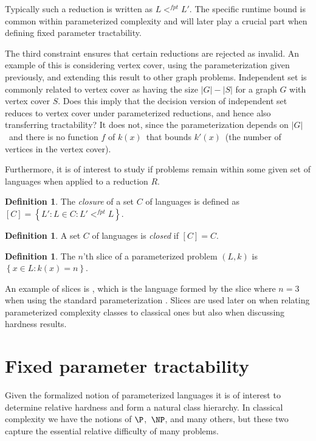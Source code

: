 \documentclass[a4paper,11pt]{report}
\theoremstyle{plain}
\theoremstyle{definition}
\newtheorem{defn}[thm]{Definition} %
\begin{document}
Typically such a reduction is written as $L <^{fpt} L'$.
The specific runtime bound is common within parameterized complexity and will later play a crucial part when defining fixed parameter tractability.

The third constraint ensures that certain reductions are rejected as invalid.
An example of this is considering vertex cover, using the parameterization given previously, and extending this result to other graph problems.
Independent set is commonly related to vertex cover as having the size $|G| - |S|$ for a graph $G$ with vertex cover $S$.
Does this imply that the decision version of independent set reduces to vertex cover under parameterized reductions, and hence also transferring tractability?
It does not, since the parameterization depends on $|G|$ and there is no function $f$ of $k(x)$ that bounds $k'(x)$ (the number of vertices in the vertex cover).

Furthermore, it is of interest to study if problems remain within some given set of languages when applied to a reduction $R$.

\begin{defn}
The \emph{closure} of a set $C$ of languages is defined as $\left[ C \right] = \left\{ L' : L \in C : L' <^{fpt} L\right\}$.
\end{defn}

\begin{defn}
A set $C$ of languages is \emph{closed} if $\left[ C \right] = C$.
\end{defn}

\begin{defn}
The $n$'th slice of a parameterized problem $(L, k)$ is $\left\{ x \in L : k(x) = n \right\}$.
\end{defn}

An example of slices is , which is the language formed by the slice where $n = 3$ when using the standard parameterization .
Slices are used later on when relating parameterized complexity classes to classical ones but also when discussing hardness results.

\section{Fixed parameter tractability}
Given the formalized notion of parameterized languages it is of interest to determine relative hardness and form a natural class hierarchy.
In classical complexity we have the notions of $\P$, $\NP$, and many others, but these two capture the essential relative difficulty of many problems.
\end{document}
